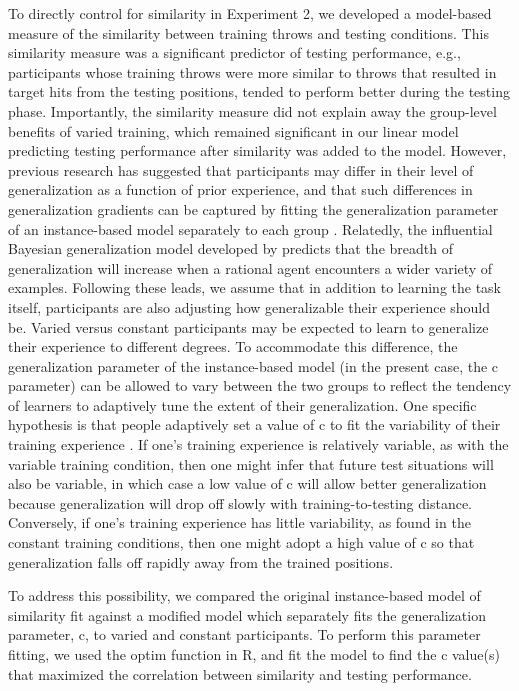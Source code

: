 \documentclass[
  12pt,
  letterpaper,
]{article}
\begin{document}
To directly control for similarity in Experiment 2, we developed a
model-based measure of the similarity between training throws and
testing conditions. This similarity measure was a significant predictor
of testing performance, e.g., participants whose training throws were
more similar to throws that resulted in target hits from the testing
positions, tended to perform better during the testing phase.
Importantly, the similarity measure did not explain away the group-level
benefits of varied training, which remained significant in our linear
model predicting testing performance after similarity was added to the
model. However, previous research has suggested that participants may
differ in their level of generalization as a function of prior
experience, and that such differences in generalization gradients can be
captured by fitting the generalization parameter of an instance-based
model separately to each group
\autocite{hahnEffectsCategoryDiversity2005,lambertsFlexibleTuningSimilarity1994}.
Relatedly, the influential Bayesian generalization model developed by
\textcite{tenenbaumGeneralizationSimilarityBayesian2001a} predicts that
the breadth of generalization will increase when a rational agent
encounters a wider variety of examples. Following these leads, we assume
that in addition to learning the task itself, participants are also
adjusting how generalizable their experience should be. Varied versus
constant participants may be expected to learn to generalize their
experience to different degrees. To accommodate this difference, the
generalization parameter of the instance-based model (in the present
case, the c parameter) can be allowed to vary between the two groups to
reflect the tendency of learners to adaptively tune the extent of their
generalization. One specific hypothesis is that people adaptively set a
value of c to fit the variability of their training experience
\autocite{nosofskyExemplarbasedAccountsMultiplesystem2000,sakamotoTrackingVariabilityLearning2006}.
If one's training experience is relatively variable, as with the
variable training condition, then one might infer that future test
situations will also be variable, in which case a low value of c will
allow better generalization because generalization will drop off slowly
with training-to-testing distance. Conversely, if one's training
experience has little variability, as found in the constant training
conditions, then one might adopt a high value of c so that
generalization falls off rapidly away from the trained positions.

To address this possibility, we compared the original instance-based
model of similarity fit against a modified model which separately fits
the generalization parameter, c, to varied and constant participants. To
perform this parameter fitting, we used the optim function in R, and fit
the model to find the c value(s) that maximized the correlation between
similarity and testing performance.
\end{document}
